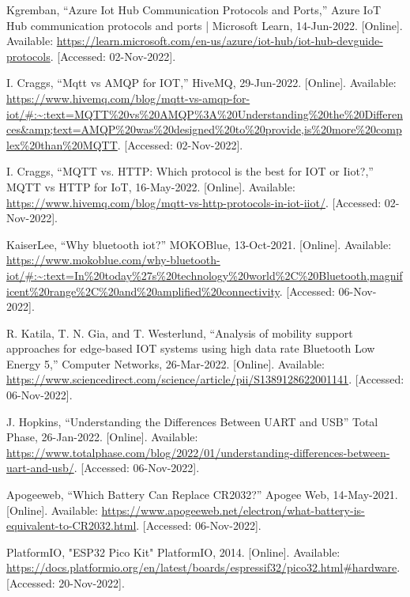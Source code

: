 \begin{thebibliography}{00}
     Kgremban, “Azure Iot Hub Communication Protocols and Ports,” Azure IoT Hub communication protocols and ports | Microsoft Learn, 14-Jun-2022. [Online]. Available: \url{https://learn.microsoft.com/en-us/azure/iot-hub/iot-hub-devguide-protocols}. [Accessed: 02-Nov-2022]. 

     I. Craggs, “Mqtt vs AMQP for IOT,” HiveMQ, 29-Jun-2022. [Online]. Available: \url{https://www.hivemq.com/blog/mqtt-vs-amqp-for-iot/#:~:text=MQTT%20vs%20AMQP%3A%20Understanding%20the%20Differences&amp;text=AMQP%20was%20designed%20to%20provide,is%20more%20complex%20than%20MQTT}. [Accessed: 02-Nov-2022]. 
    
     I. Craggs, “MQTT vs. HTTP: Which protocol is the best for IOT or Iiot?,” MQTT vs HTTP for IoT, 16-May-2022. [Online]. Available: \url{https://www.hivemq.com/blog/mqtt-vs-http-protocols-in-iot-iiot/}. [Accessed: 02-Nov-2022]. 
    
     KaiserLee, “Why bluetooth iot?” MOKOBlue, 13-Oct-2021. [Online]. Available: \url{https://www.mokoblue.com/why-bluetooth-iot/#:~:text=In%20today%27s%20technology%20world%2C%20Bluetooth,magnificent%20range%2C%20and%20amplified%20connectivity}. [Accessed: 06-Nov-2022]. 
    
     R. Katila, T. N. Gia, and T. Westerlund, “Analysis of mobility support approaches for edge-based IOT systems using high data rate Bluetooth Low Energy 5,” Computer Networks, 26-Mar-2022. [Online]. Available: \url{https://www.sciencedirect.com/science/article/pii/S1389128622001141}. [Accessed: 06-Nov-2022].
    
     J. Hopkins, “Understanding the Differences Between UART and USB” Total Phase, 26-Jan-2022. [Online]. Available: \url{https://www.totalphase.com/blog/2022/01/understanding-differences-between-uart-and-usb/}. [Accessed: 06-Nov-2022].

     Apogeeweb, “Which Battery Can Replace CR2032?” Apogee Web, 14-May-2021. [Online]. Available: \url{https://www.apogeeweb.net/electron/what-battery-is-equivalent-to-CR2032.html}. [Accessed: 06-Nov-2022].
    
     PlatformIO, "ESP32 Pico Kit" PlatformIO, 2014. [Online]. Available: \url{https://docs.platformio.org/en/latest/boards/espressif32/pico32.html#hardware}. [Accessed: 20-Nov-2022].
\end{thebibliography}